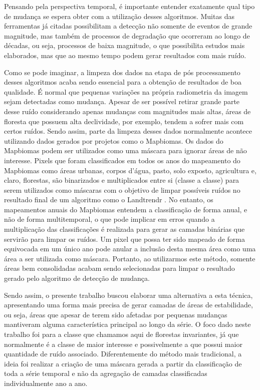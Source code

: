 Pensando pela perspectiva temporal, é importante entender exatamente qual tipo de mudança se espera obter com a utilização desses algoritmos. Muitas das ferramentas já citadas possibilitam a detecção não somente de eventos de grande magnitude, mas também de processos de degradação que ocorreram ao longo de décadas, ou seja, processos de baixa magnitude, o que possibilita estudos mais elaborados, mas que ao mesmo tempo podem gerar resultados com mais ruído.

Como se pode imaginar, a limpeza dos dados na etapa de pós processamento desses algoritmos acaba sendo essencial para a obtenção de resultados de boa qualidade. É normal que pequenas variações na própria radiometria da imagem sejam detectadas como mudança. Apesar de ser possível retirar grande parte desse ruído considerando apenas mudanças com magnitudes mais altas, áreas de floresta que possuem alta declividade, por exemplo, tendem a sofrer mais com certos ruídos. Sendo assim, parte da limpeza desses dados normalmente acontece utilizando dados gerados por projetos como o Mapbiomas. Os dados do Mapbiomas podem ser utilizados como uma máscara para ignorar áreas de não interesse. Pixels que foram classificados em todos os anos do mapeamento do Mapbiomas como áreas urbanas, corpos d’água, pasto, solo exposto, agricultura e, claro, florestas, são binarizados e multiplicados entre si (classe a classe) para serem utilizados como máscaras com o objetivo de limpar possíveis ruídos no resultado final de um algoritmo como o Landtrendr \cite{KENNEDY2007370, KENNEDY20102897, Kennedy2018}. No entanto, os mapeamentos anuais do Mapbiomas entendem a classificação de forma anual, e não de forma multitemporal, o que pode implicar em erros quando a multiplicação das classificações é realizada para gerar as camadas binárias que servirão para limpar os ruídos. Um pixel que possa ter sido mapeado de forma equivocada em um único ano pode anular a inclusão desta mesma área como uma área a ser utilizada como máscara. Portanto, ao utilizarmos este método, somente áreas bem consolidadas acabam sendo selecionadas para limpar o resultado gerado pelo algoritmo de detecção de mudança.

Sendo assim, o presente trabalho buscou elaborar uma alternativa a esta técnica, apresentando uma forma mais precisa de gerar camadas de áreas de estabilidade, ou seja, áreas que apesar de terem sido afetadas por pequenas mudanças mantiveram alguma característica principal ao longo da série. O foco dado neste trabalho foi para a classe que chamamos aqui de florestas invariantes, já que normalmente é a classe de maior interesse e possivelmente a que possui maior quantidade de ruído associado. Diferentemente do método mais tradicional, a ideia foi realizar a criação de uma máscara gerada a partir da classificação de toda a série temporal e não da agregação de camadas classificadas individualmente ano a ano. 

